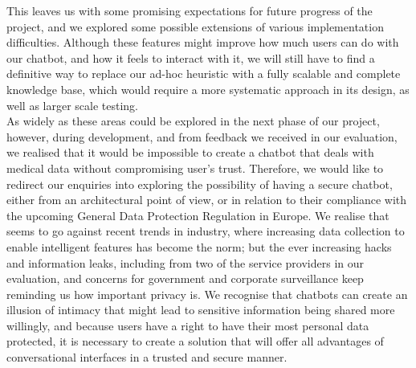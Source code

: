This leaves us with some promising expectations for future progress of the project, and we explored some possible extensions of various implementation difficulties. Although these features might improve how much users can do with our chatbot, and how it feels to interact with it, we will still have to find a definitive way to replace our ad-hoc heuristic with a fully scalable and complete knowledge base, which would require a more systematic approach in its design, as well as larger scale testing. \\
As widely as these areas could be explored in the next phase of our project, however, during development, and from feedback we received in our evaluation, we realised that it would be impossible to create a chatbot that deals with medical data without compromising user's trust. Therefore, we would like to redirect our enquiries into exploring the possibility of having a secure chatbot, either from an architectural point of view, or in relation to their compliance with the upcoming General Data Protection Regulation in Europe. We realise that seems to go against recent trends in industry, where increasing data collection to enable intelligent features has become the norm; but the ever increasing hacks and information leaks, including from two of the service providers in our evaluation, and concerns for government and corporate surveillance keep reminding us how important privacy is. We recognise that chatbots can create an illusion of intimacy that might lead to sensitive information being shared more willingly, and because users have a right to have their most personal data protected, it is necessary to create a solution that will offer all advantages of conversational interfaces in a trusted and secure manner.

